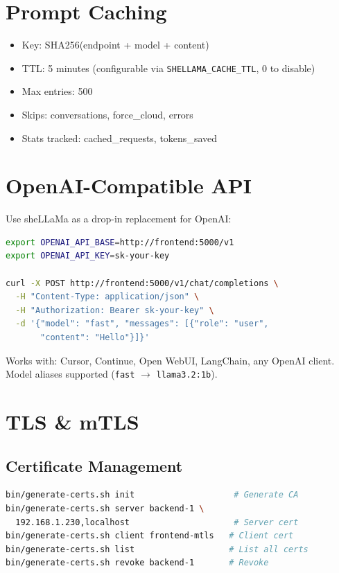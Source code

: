 \documentclass[11pt,a4paper]{article}
\begin{document}
\section{Prompt Caching}

\begin{itemize}
  \item Key: SHA256(endpoint + model + content)
  \item TTL: 5 minutes (configurable via \texttt{SHELLAMA\_CACHE\_TTL}, 0 to disable)
  \item Max entries: 500
  \item Skips: conversations, force\_cloud, errors
  \item Stats tracked: cached\_requests, tokens\_saved
\end{itemize}

\section{OpenAI-Compatible API}

Use sheLLaMa as a drop-in replacement for OpenAI:
\begin{lstlisting}[language=bash]
export OPENAI_API_BASE=http://frontend:5000/v1
export OPENAI_API_KEY=sk-your-key

curl -X POST http://frontend:5000/v1/chat/completions \
  -H "Content-Type: application/json" \
  -H "Authorization: Bearer sk-your-key" \
  -d '{"model": "fast", "messages": [{"role": "user",
       "content": "Hello"}]}'
\end{lstlisting}

Works with: Cursor, Continue, Open WebUI, LangChain, any OpenAI client. Model aliases supported (\texttt{fast} $\rightarrow$ \texttt{llama3.2:1b}).

\section{TLS \& mTLS}

\subsection{Certificate Management}
\begin{lstlisting}[language=bash]
bin/generate-certs.sh init                    # Generate CA
bin/generate-certs.sh server backend-1 \
  192.168.1.230,localhost                     # Server cert
bin/generate-certs.sh client frontend-mtls   # Client cert
bin/generate-certs.sh list                   # List all certs
bin/generate-certs.sh revoke backend-1       # Revoke
\end{lstlisting}
\end{document}
